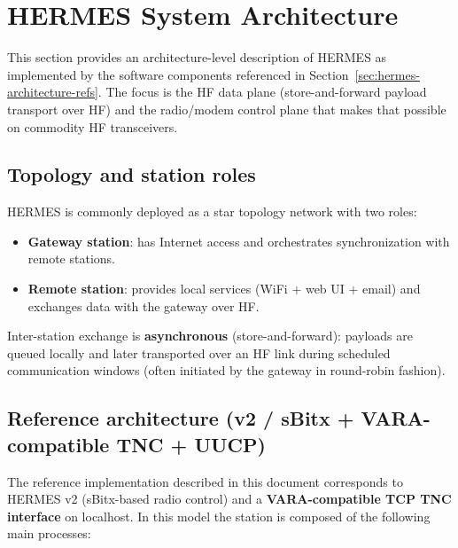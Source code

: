 \section{HERMES System Architecture}
\label{sec:hermes-architecture}

This section provides an architecture-level description of HERMES as implemented by the software components referenced in
Section~\ref{sec:hermes-architecture-refs}. The focus is the HF data plane (store-and-forward payload transport over HF) and the
radio/modem control plane that makes that possible on commodity HF transceivers.

\subsection{Topology and station roles}

HERMES is commonly deployed as a star topology network with two roles:
\begin{itemize}
\item \textbf{Gateway station}: has Internet access and orchestrates synchronization with remote stations.
\item \textbf{Remote station}: provides local services (WiFi + web UI + email) and exchanges data with the gateway over HF.
\end{itemize}

Inter-station exchange is \textbf{asynchronous} (store-and-forward): payloads are queued locally and later transported over an HF link
during scheduled communication windows (often initiated by the gateway in round-robin fashion).

\subsection{Reference architecture (v2 / sBitx + VARA-compatible TNC + UUCP)}
\label{sec:hermes-architecture-reference}

The reference implementation described in this document corresponds to HERMES v2 (sBitx-based radio control) and a
\textbf{VARA-compatible TCP TNC interface} on localhost. In this model the station is composed of the following main processes:

